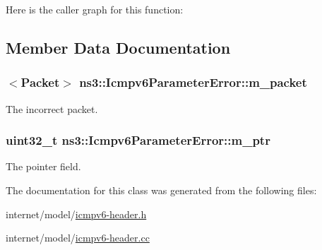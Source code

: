 Here is the caller graph for this function\+:




\subsection{Member Data Documentation}
\subsubsection[{\texorpdfstring{m\+\_\+packet}{m_packet}}]{$<${\bf Packet}$>$ ns3\+::\+Icmpv6\+Parameter\+Error\+::m\+\_\+packet\hspace{0.3cm}{\ttfamily [private]}}\hypertarget{classns3_1_1Icmpv6ParameterError_a9658405ad7171c28dfa3bb4e896d295c}{}\label{classns3_1_1Icmpv6ParameterError_a9658405ad7171c28dfa3bb4e896d295c}


The incorrect packet. 

\subsubsection[{\texorpdfstring{m\+\_\+ptr}{m_ptr}}]{\setlength{\rightskip}{0pt plus 5cm}uint32\+\_\+t ns3\+::\+Icmpv6\+Parameter\+Error\+::m\+\_\+ptr\hspace{0.3cm}{\ttfamily [private]}}\hypertarget{classns3_1_1Icmpv6ParameterError_a0f0b7416fb35c6624a3b35a4316fb86c}{}\label{classns3_1_1Icmpv6ParameterError_a0f0b7416fb35c6624a3b35a4316fb86c}


The pointer field. 



The documentation for this class was generated from the following files\+:\begin{DoxyCompactItemize}
\item 
internet/model/\hyperlink{icmpv6-header_8h}{icmpv6-\/header.\+h}\item 
internet/model/\hyperlink{icmpv6-header_8cc}{icmpv6-\/header.\+cc}\end{DoxyCompactItemize}
